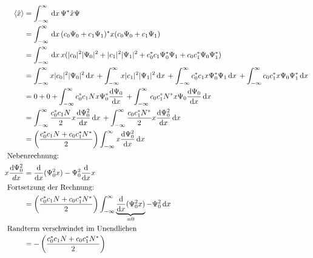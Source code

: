 \begin{align}
    \langle \hat x \rangle &= \int_{-\infty}^{\infty} \,\mathrm{d}x\, \Psi^* \hat x \Psi \\
    &=\int_{-\infty}^{\infty} \,\mathrm{d}x\, (c_0 \Psi _0 + c_1 \Psi _1)^*x(c_0 \Psi _0+c_1 \Psi _1) \nonumber\\
    &=\int_{-\infty}^{\infty} \,\mathrm{d}x\, x (\lvert c_0\rvert^2\lvert\Psi _0\rvert^2+\lvert c_1\rvert^2 \lvert\Psi _1\rvert^2 + c_0^* c_1 \Psi_0^*\Psi _1+c_0 c_1^* \Psi _0 \Psi _1^*) \nonumber\\
    &=\int_{-\infty}^{\infty} x \lvert c_0\rvert^2 \lvert\Psi _0\rvert^2 \,\mathrm{d}x\, +\int_{-\infty}^{\infty}  
    x \lvert c_1\rvert^2 \lvert\Psi _1\rvert^2 \,\mathrm{d}x\, +\int_{-\infty}^{\infty} c_0^* c_1 x \Psi_0^*\Psi_1 \,\mathrm{d}x\,
    + \int_{-\infty}^{\infty}  c_0 c_1^*x \Psi _0 \Psi_1^* \,\mathrm{d}x\, \nonumber\\
    &= 0+0+\int_{-\infty}^{\infty} c_0^*c_1 N x \Psi _0^* \frac{\mathrm{d}\Psi _0}{\mathrm{d}x} \,+\int_{-\infty}^{\infty}  c_0 c_1^* N^* x \Psi _0 \frac{\mathrm{d}\Psi _0}{\mathrm{d}x} \,\mathrm{d}x\, \nonumber\\
    &= \int_{-\infty}^{\infty} \frac{c_0^*c_1N}{2}x \frac{\mathrm{d} \Psi _0^2}{\mathrm{d}x}  \,\mathrm{d}x\, +\int_{-\infty}^{\infty} \frac{c_0 c_1^* N^*}{2}x \frac{\mathrm{d}\Psi _0^2 }{\mathrm{d}x} \,\mathrm{d}x\, \nonumber\\
    &=\left(\frac{c_0^* c_1 N+c_0c_1^*N^*}{2}\right)\int_{-\infty}^{\infty} x \frac{\mathrm{d}\Psi _0^2 }{\mathrm{d}x} \,\mathrm{d}x\, \nonumber\\
    \intertext {
        Nebenrechnung:
    }    
    x\frac{\mathrm{d}\Psi _0^2}{dx} &= \frac{\mathrm{d}}{\mathrm{d}x}(\Psi _0^2 x)-\Psi_0^2 \frac{\mathrm{d}}{\mathrm{d}x}x\\
    \intertext{
        Fortsetzung der Rechnung:
    }
    &= \left(\frac{c_0^* c_1 N+c_0c_1^*N^*}{2}\right) \int_{-\infty}^{\infty} \underbrace{\frac{\mathrm{d}}{\mathrm{d}x}(\Psi _0^2 x)}_{=0} -\Psi_0^2 \,\mathrm{d}x\, \\
    \intertext{
        Randterm verschwindet im Unendlichen
    }
    &= -\left(\frac{c_0^* c_1 N+c_0c_1^*N^*}{2}\right)
\end{align}

